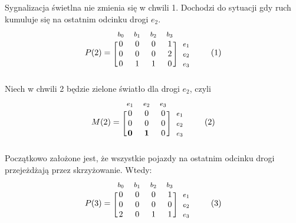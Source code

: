 \documentclass[12pt]{book}
\newcommand\addtag{\refstepcounter{equation}
\tag{\theequation}}
\begin{document}
Sygnalizacja świetlna nie zmienia się w chwili 1. Dochodzi do sytuacji gdy ruch kumuluje się na ostatnim odcinku drogi $e_2$.
\begin{equation*}
  P(2)=
  \begin{blockarray}{*{4}{c} l}
    \begin{block}{*{4}{>{$\footnotesize}c<{$}} l}
      $b_0$ & $b_1$ & $b_2$ & $b_3$ \\
    \end{block}
    \begin{block}{[*{4}{c}]>{$\footnotesize}l<{$}}
       0 & 0 & 0 & 1 & $e_1$ \\
       0 & 0 & 0 & 2 & $e_2$ \\
       0 & 1 & 1 & 0 & $e_3$ \\
    \end{block}
  \end{blockarray} \addtag \label{skrz_1_zmiennaStanu_0_sygnalizacja}
\end{equation*}
Niech w chwili 2 będzie zielone światło dla drogi $e_2$, czyli
\begin{equation*}
  M(2)=
  \begin{blockarray}{*{3}{c} l}
    \begin{block}{*{3}{>{$\footnotesize}c<{$}} l}
     $e_1$ & $e_2$ & $e_3$\\
    \end{block}
    \begin{block}{[*{3}{c}]>{$\footnotesize}l<{$}}
       0 & 0 & 0 & $e_1$ \\
       0 & 0 & 0 & $e_2$ \\
       \textbf{0} & \textbf{1} & 0 & $e_3$ \\
    \end{block}
  \end{blockarray} \addtag
\end{equation*}
Początkowo założone jest, że wszystkie pojazdy na ostatnim odcinku drogi przejeżdżają przez skrzyżowanie. Wtedy:
\begin{equation*}
  P(3)=
  \begin{blockarray}{*{4}{c} l}
    \begin{block}{*{4}{>{$\footnotesize}c<{$}} l}
      $b_0$ & $b_1$ & $b_2$ & $b_3$ \\
    \end{block}
    \begin{block}{[*{4}{c}]>{$\footnotesize}l<{$}}
       0 & 0 & 0 & 1 & $e_1$ \\
       0 & 0 & 0 & 0 & $e_2$ \\
       2 & 0 & 1 & 1 & $e_3$ \\
    \end{block}
  \end{blockarray} \addtag \label{skrz_1_zmiennaStanu_0_sygnalizacja}
\end{equation*}
\end{document}

